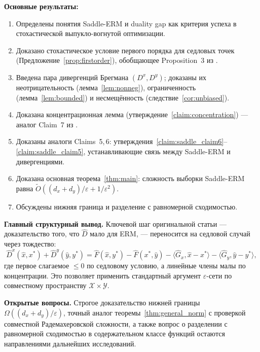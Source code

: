 \documentclass[12pt,a4paper]{article}
\theoremstyle{plain}
\theoremstyle{definition}
\newcommand{\cX}{\mathcal{X}}
\newcommand{\cY}{\mathcal{Y}}
\newcommand{\hatF}{\hat{F}}
\newcommand{\hatD}{\hat{D}}
\newcommand{\hatG}{\hat{G}}
\begin{document}
\textbf{Основные результаты:}
\begin{enumerate}
    \item Определены понятия Saddle-ERM и duality gap как критерия успеха в стохастической выпукло-вогнутой оптимизации.
    \item Доказано стохастическое условие первого порядка для седловых точек (Предложение~\ref{prop:firstorder}), обобщающее Proposition~3 из \cite{CLY2023}.
    \item Введена пара дивергенций Брегмана $(D^x,D^y)$; доказаны их неотрицательность (лемма~\ref{lem:nonneg}), ограниченность (лемма~\ref{lem:bounded}) и несмещённость (следствие~\ref{cor:unbiased}).
    \item Доказана концентрационная лемма (утверждение~\ref{claim:concentration}) --- аналог Claim~7 из \cite{CLY2023}.
    \item Доказаны аналоги Claims~5,\,6: утверждения~\ref{claim:saddle_claim6}--\ref{claim:saddle_claim5}, устанавливающие связь между Saddle-ERM и дивергенциями.
    \item Доказана основная теорема~\ref{thm:main}: сложность выборки Saddle-ERM равна $\tilde{O}((d_x+d_y)/\varepsilon+1/\varepsilon^2)$.
    \item Обсуждены нижняя граница и разделение с равномерной сходимостью.
\end{enumerate}

\textbf{Главный структурный вывод.} Ключевой шаг оригинальной статьи --- доказательство того, что $\hat{D}$ мало для ERM, --- переносится на седловой случай через тождество:
\[
    \hatD^x(\hat{x},x^*)+\hatD^y(\hat{y},y^*)=\hatF(\hat{x},y^*)-\hatF(x^*,\hat{y})-\langle\hatG_x,\hat{x}-x^*\rangle-\langle\hatG_y,\hat{y}-y^*\rangle,
\]
где первое слагаемое $\le 0$ по седловому условию, а линейные члены малы по концентрации. Это позволяет применить стандартный аргумент $\varepsilon$-сети по совместному пространству $\cX\times\cY$.

\textbf{Открытые вопросы.} Строгое доказательство нижней границы $\Omega((d_x+d_y)/\varepsilon)$, точный аналог теоремы~\ref{thm:general_norm} с проверкой совместной Радемахеровской сложности, а также вопрос о разделении с равномерной сходимостью в содержательном классе функций остаются направлениями дальнейших исследований.
\end{document}
